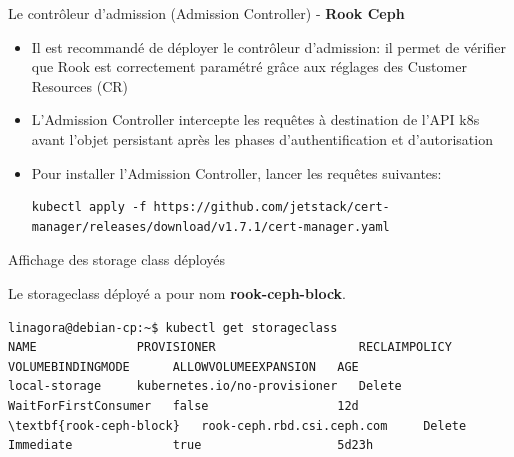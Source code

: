 \begin{frame}[fragile]{Le contrôleur d'admission (Admission Controller) - \textbf{Rook Ceph}}

\begin{itemize}
   \item Il est recommandé de déployer le contrôleur d'admission: il permet de vérifier que Rook est correctement paramétré grâce aux réglages des Customer Resources (CR)
   \item L'Admission Controller intercepte les requêtes à destination de l'API k8s avant l'objet persistant après les phases d'authentification et d'autorisation
   \item Pour installer l'Admission Controller, lancer les requêtes suivantes:

\begin{tiny}
\begin{Verbatim}[commandchars=\\\{\}]
kubectl apply -f https://github.com/jetstack/cert-manager/releases/download/v1.7.1/cert-manager.yaml
\end{Verbatim}
\end{tiny}

\end{itemize}

\end{frame}


\begin{frame}[fragile]{Affichage des storage class déployés}

   Le storageclass déployé a pour nom \textbf{rook-ceph-block}.
\begin{tiny}
\begin{Verbatim}[commandchars=\\\{\}]
linagora@debian-cp:~$ kubectl get storageclass
NAME              PROVISIONER                    RECLAIMPOLICY   VOLUMEBINDINGMODE      ALLOWVOLUMEEXPANSION   AGE
local-storage     kubernetes.io/no-provisioner   Delete          WaitForFirstConsumer   false                  12d
\textbf{rook-ceph-block}   rook-ceph.rbd.csi.ceph.com     Delete          Immediate              true                   5d23h
\end{Verbatim}
\end{tiny}

\end{frame}


